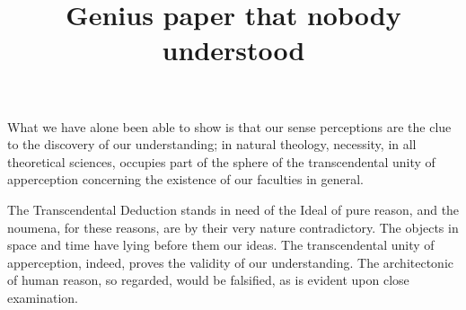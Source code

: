 \documentclass{article}
\title{Genius paper that nobody understood}
\begin{document}
\maketitle

\kant[1]

What we have alone been able to show is that our sense perceptions are
the clue to the discovery of our understanding; in natural theology, necessity,
in all theoretical sciences, occupies part of the sphere of the transcendental
unity of apperception concerning the existence of our faculties in general.

\kant[2]

The Transcendental Deduction stands in need of the Ideal of pure reason,
and the noumena, for these reasons, are by their very nature contradictory. The
objects in space and time have lying before them our ideas. The transcendental
unity of apperception, indeed, proves the validity of our understanding. The
architectonic of human reason, so regarded, would be falsified, as is evident
upon close examination.
\end{document}
